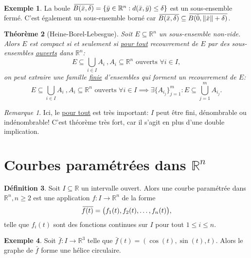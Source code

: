 \documentclass{report}
\theoremstyle{plain}
\newtheorem{thm}{Théorème}[chapter]
\theoremstyle{definition}
\newtheorem{defn}[thm]{Définition}
\newtheorem{exmp}[thm]{Exemple}
\theoremstyle{remark}
\newtheorem*{remark}{Remarque}
\newcommand*{\skol}[2][3]{{}\mkern#1mu\overline{\mkern-#1mu#2}} %
\newcommand*\adh[1]{\skol{#1}}
\newcommand*{\norm}[1]{\lVert#1\rVert}
\begin{document}
\begin{exmp}
	La boule $\adh{B(\bar x, \delta)} = \{\bar y \in \mathbb R^n : d(\bar x, \bar y) \leq \delta\}$ est un sous-ensemble fermé. C'est également un sous-ensemble borné car $\adh{B(\bar x, \delta)} \subseteq \adh{B(\bar 0, \norm{\bar x} + \delta)}$.
\end{exmp}

\begin{thm}[Heine-Borel-Lebesgue]
	Soit $E \subseteq \mathbb R^n$ un sous-ensemble non-vide. Alors $E$ est compact si et seulement si \underline{pour tout} recouvrement de $E$ par des sous-ensembles \underline{ouverts} dans $\mathbb R^n$:
	\begin{equation}
		E \subseteq \bigcup_{i \in I} A_i \ , A_i \subseteq \mathbb R^n \text{ ouverts } \forall i \in I,
	\end{equation}
	on peut extraire une famille \underline{finie} d'ensembles qui forment un recouvrement de $E$:
	\begin{equation}
		E \subseteq \bigcup_{i \in I} A_i \ , A_i \subseteq \mathbb R^n \text{ ouverts } \forall i \in I \implies \exists\{A_{i_j}\}_{j=1}^m : E \subseteq \bigcup_{j=1}^m A_{i_j}.
	\end{equation}
\end{thm}
\begin{remark} Ici, le \underline{pour tout} est très important: $I$ peut être fini, dénombrable ou indénombrable! C'est théorème très fort, car il s'agit en plus d'une double implication. \end{remark}

\section{Courbes paramétrées dans $\mathbb R^n$}
\begin{defn}
	Soit $I \subseteq \mathbb R$ un intervalle ouvert. Alors une courbe paramétrée dans $\mathbb R^n, n \geq 2$ est une application $f : I \to \mathbb R^n$ de la forme
	\begin{equation}
		\adh{f(t)} = \bigl(f_1(t), f_2(t), \ldots, f_n(t)\bigr),
	\end{equation}
	telle que $f_i(t)$ sont des fonctions continues sur $I$ pour tout $1 \leq i \leq n$.
\end{defn}

\begin{exmp}
	Soit $\bar f : I \to \mathbb R^3$ telle que $\bar f(t) = (\cos(t), \sin(t), t)$. Alors le graphe de $\bar f$ forme une hélice circulaire.
\end{exmp}
\end{document}
